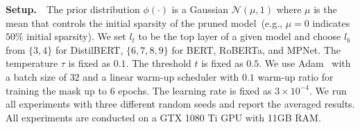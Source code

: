 \noindent
\textbf{Setup.}~~The prior distribution $\phi(\cdot)$ is a Gaussian $\mathcal{N}(\mu, 1)$ 
where $\mu$ is the mean that controls the initial sparsity of the pruned model~(e.g., 
$\mu=0$ indicates $50\%$ initial sparsity).
We set $l_t$ to be the top layer of a given model 
and choose $l_b$ from $\{3,4\}$ for DistilBERT, $\{6,7,8,9\}$ for BERT, RoBERTa, 
and MPNet. The temperature $\tau$ is fixed as $0.1$. The threshold $t$ is fixed as $0.5$. 
We use Adam~\citep{kingma2014method} with a batch size of $32$ and a linear warm-up scheduler 
with $0.1$ warm-up ratio for training the mask up to $6$ epochs. 
The learning rate is fixed as $3\times 10^{-4}$. We run all experiments with three different random seeds and report the averaged results. All experiments are conducted on a GTX 1080 Ti GPU with 11GB RAM.


